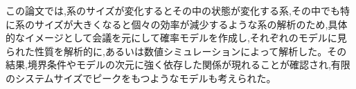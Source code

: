この論文では,系のサイズが変化するとその中の状態が変化する系,その中でも特に系のサイズが大きくなると個々の効率が減少するような系の解析のため,具体的なイメージとして会議を元にして確率モデルを作成し,それぞれのモデルに見られた性質を解析的に,あるいは数値シミュレーションによって解析した。その結果,境界条件やモデルの次元に強く依存した関係が現れることが確認され,有限のシステムサイズでピークをもつようなモデルも考えられた。
